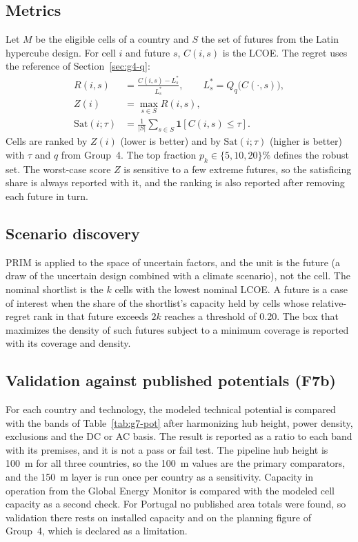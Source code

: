 \subsection{Metrics}
Let $M$ be the eligible cells of a country and $S$ the set of futures from the Latin hypercube design. For cell $i$ and future $s$, $C(i,s)$ is the LCOE. The regret uses the reference of Section~\ref{sec:g4-q}:
\begin{align}
R(i,s) &= \frac{C(i,s) - L^{*}_{s}}{L^{*}_{s}}, \qquad L^{*}_{s} = Q_{q}\!\big(C(\cdot,s)\big), \label{eq:g7-regret}\\
Z(i)   &= \max_{s \in S} R(i,s), \label{eq:g7-mmr}\\
\mathrm{Sat}(i;\tau) &= \frac{1}{|S|} \sum_{s \in S} \mathbf{1}\!\left[C(i,s) \le \tau\right]. \label{eq:g7-sat}
\end{align}
Cells are ranked by $Z(i)$ (lower is better) and by $\mathrm{Sat}(i;\tau)$ (higher is better) with $\tau$ and $q$ from Group~4. The top fraction $p_k \in \{5, 10, 20\}\%$ defines the robust set. The worst-case score $Z$ is sensitive to a few extreme futures, so the satisficing share is always reported with it, and the ranking is also reported after removing each future in turn.

\subsection{Scenario discovery}
PRIM is applied to the space of uncertain factors, and the unit is the future (a draw of the uncertain design combined with a climate scenario), not the cell. The nominal shortlist is the $k$ cells with the lowest nominal LCOE. A future is a case of interest when the share of the shortlist's capacity held by cells whose relative-regret rank in that future exceeds $2k$ reaches a threshold of 0.20. The box that maximizes the density of such futures subject to a minimum coverage is reported with its coverage and density. %

\subsection{Validation against published potentials (F7b)}
For each country and technology, the modeled technical potential is compared with the bands of Table~\ref{tab:g7-pot} after harmonizing hub height, power density, exclusions and the DC or AC basis. The result is reported as a ratio to each band with its premises, and it is not a pass or fail test. The pipeline hub height is 100~m for all three countries, so the 100~m values are the primary comparators, and the 150~m layer is run once per country as a sensitivity. Capacity in operation from the Global Energy Monitor is compared with the modeled cell capacity as a second check. %
For Portugal no published area totals were found, so validation there rests on installed capacity and on the planning figure of Group~4, which is declared as a limitation.

